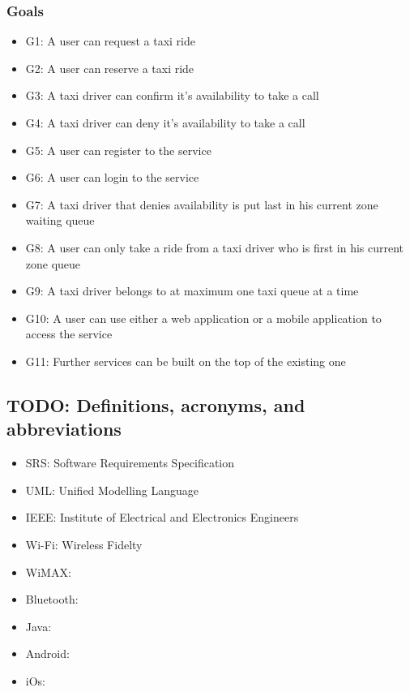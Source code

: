 \subsubsection{Goals}
\begin{itemize}
	\item G1: A user can request a taxi ride
	\item G2: A user can reserve a taxi ride
	\item G3: A taxi driver can confirm it's availability to take a call
	\item G4: A taxi driver can deny it's availability to take a call
	\item G5: A user can register to the service
	\item G6: A user can login to the service
	\item G7: A taxi driver that denies availability is put last in his current zone waiting queue
	\item G8: A user can only take a ride from a taxi driver who is first in his current zone queue
	\item G9: A taxi driver belongs to at maximum one taxi queue at a time
	\item G10: A user can use either a web application or a mobile application to access the service
	\item G11: Further services can be built on the top of the existing one
\end{itemize}
\subsection{TODO: Definitions, acronyms, and abbreviations}
\begin{itemize}
	\item SRS: Software Requirements Specification
	\item UML: Unified Modelling Language
	\item IEEE: Institute of Electrical and Electronics Engineers
	\item Wi-Fi: Wireless Fidelty
	\item WiMAX:
	\item Bluetooth:
	\item Java:
	\item Android:
	\item iOs:
\end{itemize}
